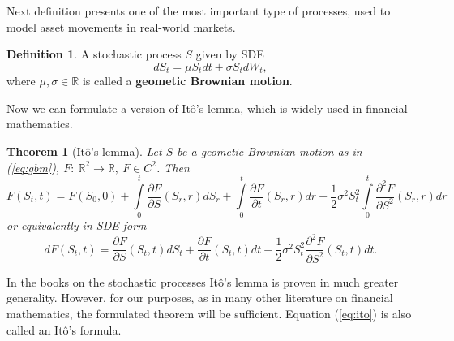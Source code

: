 \documentclass[a4paper,11pt, twoside]{book}
\newtheorem{thm}{Theorem}[chapter]
\theoremstyle{definition}
\newtheorem{mydef}{Definition}[chapter]
\theoremstyle{remark}
\def\R{{\mathbb{R}}}
\begin{document}
Next definition presents one of the most important type of processes, used to model asset movements in real-world markets.
\begin{mydef}
 A stochastic process $S$ given by SDE
 \begin{equation}
  dS_t = \mu S_t dt + \sigma S_t dW_t, 
  \label{eq:gbm}
 \end{equation}
where $\mu,\sigma \in \R$ is called a \textbf{geometic Brownian motion}.
\end{mydef}

Now we can formulate a version of It\^{o}'s lemma, which is widely used in financial mathematics.
\begin{thm}[It\^{o}'s lemma]
 \label{thm:ito}
  Let $S$ be a geometic Brownian motion as in (\ref{eq:gbm}), $F:\ \R^2 \rightarrow \R,\ F \in C^2$. Then 
  \begin{equation*}
   F(S_t, t) = F(S_0, 0) + \int\limits_0^t \frac{\partial F}{\partial S}(S_r,r)dS_r + \int\limits_0^t \frac{\partial F}{\partial t}(S_r,r)dr + \frac{1}{2}\sigma^2 S_t^2 \int\limits_0^t \frac{\partial^2 F}{\partial S^2}(S_r,r)dr
  \end{equation*}
  or equivalently in SDE form
  \begin{equation}
   \label{eq:ito}
   dF(S_t, t) = \frac{\partial F}{\partial S}(S_t,t)dS_t + \frac{\partial F}{\partial t}(S_t,t)dt + \frac{1}{2}\sigma^2 S_t^2 \frac{\partial^2 F}{\partial S^2}(S_t,t)dt   .
  \end{equation}  
\end{thm}

\noindent In the books on the stochastic processes It\^{o}'s lemma is proven in much greater generality. However, for our purposes, as in many other literature on financial mathematics, the formulated theorem will be sufficient.
Equation (\ref{eq:ito}) is also called an It\^{o}'s formula.
\end{document}
